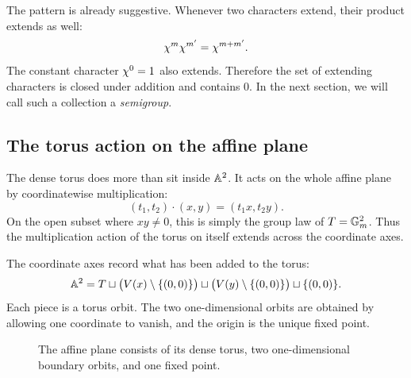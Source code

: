 The pattern is already suggestive. Whenever two characters extend,
their product extends as well:
\[
\chi^{m}\chi^{m'}
=
\chi^{m+m'}.
\]
The constant character \(\chi^{0}=1\) also extends. Therefore the
set of extending characters is closed under addition and contains
\(0\). In the next section, we will call such a collection a
\emph{semigroup}.

\subsection{The torus action on the affine plane}

The dense torus does more than sit inside \(\mathbb{A}^2\). It acts on the
whole affine plane by coordinatewise multiplication:
\[
(t_1,t_2)\cdot(x,y)
=
(t_1x,t_2y).
\]
On the open subset where \(xy\neq0\), this is simply the group law of
\(T=\mathbb{G}_{m}^2\). Thus the multiplication action of the torus on itself
extends across the coordinate axes.

The coordinate axes record what has been added to the torus:
\[
\mathbb{A}^2
=
T
\sqcup
\bigl(V(x)\setminus\{(0,0)\}\bigr)
\sqcup
\bigl(V(y)\setminus\{(0,0)\}\bigr)
\sqcup
\{(0,0)\}.
\]
Each piece is a torus orbit. The two one-dimensional orbits are
obtained by allowing one coordinate to vanish, and the origin is the
unique fixed point.

\begin{figure}[ht]
\centering
{}
\caption{The affine plane consists of its dense torus, two
one-dimensional boundary orbits, and one fixed point.}
\label{fig:a2-torus-orbits-preview}
\end{figure}

